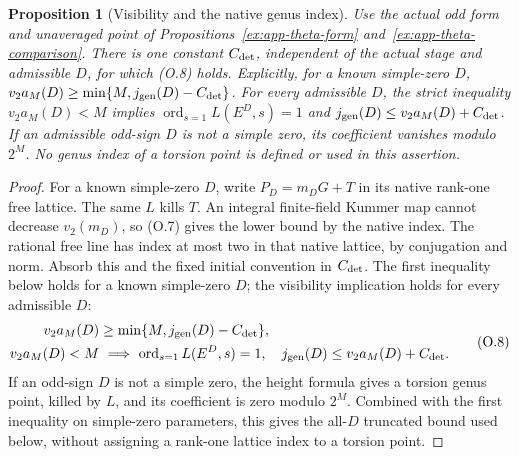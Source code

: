 \documentclass[11pt]{article}
\newtheorem{proposition}[theorem]{Proposition}
\theoremstyle{definition}
\theoremstyle{remark}
\newcommand{\ord}{\operatorname{ord}}
\begin{document}
\begin{proposition}[Visibility and the native genus index]\label{ex:app-visibility}
Use the actual odd form and unaveraged point of
Propositions~\ref{ex:app-theta-form} and~\ref{ex:app-theta-comparison}.
There is one constant $C_{\rm det}$, independent of the actual stage
and admissible $D$, for which (O.8) holds. Explicitly, for a known
simple-zero $D$,
$v_2a_M(D)\ge\min\{M,j_{\rm gen}(D)-C_{\rm det}\}$.
For every admissible $D$, the strict inequality $v_2a_M(D)<M$
implies $\operatorname{ord}_{s=1}L(E^D,s)=1$ and
$j_{\rm gen}(D)\le v_2a_M(D)+C_{\rm det}$.
If an admissible odd-sign $D$ is not a simple zero, its coefficient
vanishes modulo $2^M$. No genus index of a torsion point is defined
or used in this assertion.
\end{proposition}
\begin{proof}\leavevmode
For a known simple-zero $D$, write $P_D=m_DG+T$ in its native
rank-one free lattice. The same $L$ kills $T$.
An integral finite-field Kummer map cannot decrease
$v_2(m_D)$, so (O.7) gives the lower bound by the native index.
The rational free line has index at most two in that native
lattice, by conjugation and norm. Absorb this and the fixed
initial convention in $C_{\rm det}$. The first inequality below
holds for a known simple-zero $D$; the visibility implication holds
for every admissible $D$:
\[
 \begin{split}
 v_2a_M(D)&\ge\min\{M,j_{\rm gen}(D)-C_{\rm det}\},\\
 v_2a_M(D)<M&\ \Longrightarrow\
  \ord_{s=1}L(E^D,s)=1,\quad
       j_{\rm gen}(D)\le v_2a_M(D)+C_{\rm det}.
 \end{split}                                                    \tag{O.8}
\]
If an odd-sign $D$ is not a simple zero, the height formula gives a
torsion genus point, killed by $L$, and its coefficient is zero
modulo $2^M$. Combined with the first inequality on simple-zero
parameters, this gives the all-$D$ truncated bound used below,
without assigning a rank-one lattice index to a torsion point.
\end{proof}
\end{document}
